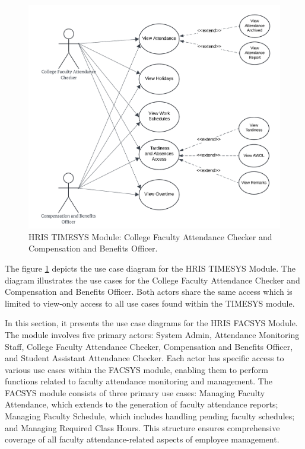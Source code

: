     \begin{figure}[H]
        \centering
        \includegraphics[width=0.9\linewidth]{figures/images/use-case-time-2.png}
        \caption{HRIS TIMESYS Module: College Faculty Attendance Checker and Compensation and Benefits Officer.}
        \label{fig:use-case-time-2}
    \end{figure}

    The figure \ref{fig:use-case-time-2} depicts the use case diagram for the HRIS TIMESYS Module. The diagram illustrates the use cases for the College Faculty Attendance Checker and Compensation and Benefits Officer. Both actors share the same access which is limited to view-only access to all use cases found within the TIMESYS module. 


    In this section, it presents the use case diagrams for the HRIS FACSYS Module. The module involves five primary actors: System Admin, Attendance Monitoring Staff, College Faculty Attendance Checker, Compensation and Benefits Officer, and Student Assistant Attendance Checker. Each actor has specific access to various use cases within the FACSYS module, enabling them to perform functions related to faculty attendance monitoring and management. The FACSYS module consists of three primary use cases: Managing Faculty Attendance, which extends to the generation of faculty attendance reports; Managing Faculty Schedule, which includes handling pending faculty schedules; and Managing Required Class Hours. This structure ensures comprehensive coverage of all faculty attendance-related aspects of employee management.

